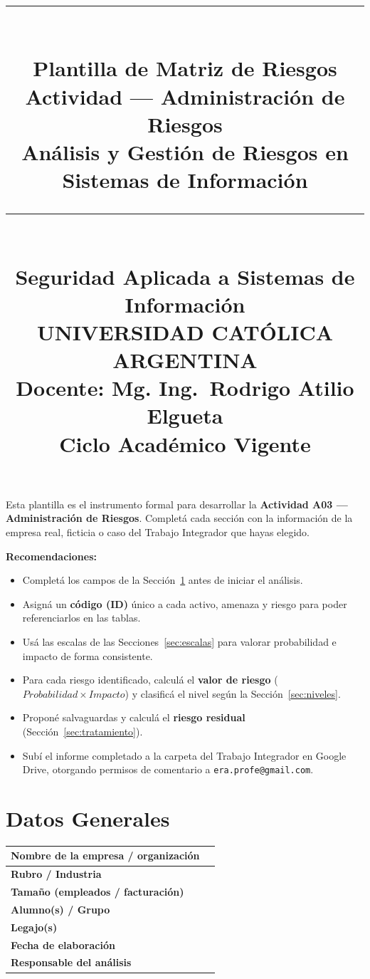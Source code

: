 \documentclass[11pt,a4paper]{article}
\title{%
  \rule{\textwidth}{1pt}\\[0.4cm]
  \textbf{\Large Plantilla de Matriz de Riesgos}\\[0.2cm]
  \large Actividad --- Administración de Riesgos\\[0.1cm]
  \normalsize Análisis y Gestión de Riesgos en Sistemas de Información\\[0.2cm]
  \rule{\textwidth}{1pt}\\[0.4cm]
  \normalsize Seguridad Aplicada a Sistemas de Información\\
  UNIVERSIDAD CATÓLICA ARGENTINA\\
  Docente: Mg. Ing.\ Rodrigo Atilio Elgueta\\[0.2cm]
  \small Ciclo Académico Vigente
}
\author{}
\date{}
\begin{document}
\maketitle
\thispagestyle{fancy}
\tableofcontents
\newpage

\begin{instruccion}
Esta plantilla es el instrumento formal para desarrollar la \textbf{Actividad A03 --- Administración de Riesgos}. Completá cada sección con la información de la empresa real, ficticia o caso del Trabajo Integrador que hayas elegido.

\textbf{Recomendaciones:}
\begin{itemize}[leftmargin=*]
  \item Completá los campos de la Sección~\ref{sec:datos} antes de iniciar el análisis.
  \item Asigná un \textbf{código (ID)} único a cada activo, amenaza y riesgo para poder referenciarlos en las tablas.
  \item Usá las escalas de las Secciones~\ref{sec:escalas} para valorar probabilidad e impacto de forma consistente.
  \item Para cada riesgo identificado, calculá el \textbf{valor de riesgo} (\(Probabilidad \times Impacto\)) y clasificá el nivel según la Sección~\ref{sec:niveles}.
  \item Proponé salvaguardas y calculá el \textbf{riesgo residual} (Sección~\ref{sec:tratamiento}).
  \item Subí el informe completado a la carpeta del Trabajo Integrador en Google Drive, otorgando permisos de comentario a \texttt{era.profe@gmail.com}.
\end{itemize}
\end{instruccion}

\section{Datos Generales}\label{sec:datos}

\begin{center}
\renewcommand{\arraystretch}{1.6}
\begin{tabularx}{\textwidth}{@{} p{5cm} X @{}}
\toprule
\textbf{Nombre de la empresa / organización} & \\
\midrule
\textbf{Rubro / Industria} & \\
\midrule
\textbf{Tamaño (empleados / facturación)} & \\
\midrule
\textbf{Alumno(s) / Grupo} & \\
\midrule
\textbf{Legajo(s)} & \\
\midrule
\textbf{Fecha de elaboración} & \\
\midrule
\textbf{Responsable del análisis} & \\
\bottomrule
\end{tabularx}
\end{center}
\end{document}
